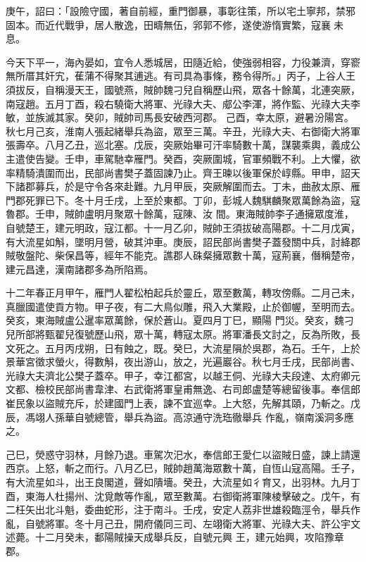 \begin{pinyinscope}
 庚午，詔曰：「設險守國，著自前經，重門御暴，事彰往策，所以宅土寧邦，禁邪固本。而近代戰爭，居人散逸，田疇無伍，郛郭不修，遂使游惰實繁，寇襄未息。



 今天下平一，海內晏如，宜令人悉城居，田隨近給，使強弱相容，力役兼濟，穿窬無所厝其奸宄，萑蒲不得聚其逋逃。有司具為事條，務令得所。」丙子，上谷人王須拔反，自稱漫天王，國號燕，賊帥魏刁兒自稱歷山飛，眾各十餘萬，北連突厥，南寇趙。五月丁酉，殺右驍衛大將軍、光祿大夫、郕公李渾，將作監、光祿大夫李敏，並族滅其家。癸卯，賊帥司馬長安破西河郡。
 己酉，幸太原，避暑汾陽宮。秋七月己亥，淮南人張起緒舉兵為盜，眾至三萬。辛丑，光祿大夫、右御衛大將軍張壽卒。八月乙丑，巡北塞。戊辰，突厥始畢可汗率騎數十萬，謀襲乘輿，義成公主遣使告變。壬申，車駕馳幸雁門。癸酉，突厥圍城，官軍頻戰不利。上大懼，欲率精騎潰圍而出，民部尚書樊子蓋固諫乃止。齊王暕以後軍保於崞縣。甲申，詔天下諸郡募兵，於是守令各來赴難。九月甲辰，突厥解圍而去。丁未，曲赦太原、雁門郡死罪已下。冬十月壬戌，上至於東都。丁卯，彭城人魏騏麟聚眾萬餘為盜，寇魯郡。壬申，賊帥盧明月聚眾十餘萬，寇陳、汝
 間。東海賊帥李子通擁眾度淮，自號楚王，建元明政，寇江都。十一月乙卯，賊帥王須拔破高陽郡。十二月戊寅，有大流星如斛，墜明月營，破其沖車。庚辰，詔民部尚書樊子蓋發關中兵，討絳郡賊敬盤陀、柴保昌等，經年不能克。譙郡人硃粲擁眾數十萬，寇荊襄，僭稱楚帝，建元昌達，漢南諸郡多為所陷焉。



 十二年春正月甲午，雁門人翟松柏起兵於靈丘，眾至數萬，轉攻傍縣。二月己未，真臘國遣使貢方物。甲子夜，有二大鳥似雕，飛入大業殿，止於御幄，至明而去。癸亥，東海賊盧公暹率眾萬餘，保於蒼山。夏四月丁巳，顯陽
 門災。癸亥，魏刁兒所部將甄翟兒復號歷山飛，眾十萬，轉寇太原。將軍潘長文討之，反為所敗，長文死之。五月丙戌朔，日有蝕之，既。癸巳，大流星隕於吳郡，為石。壬午，上於景華宮徵求螢火，得數斛，夜出游山，放之，光遍巖谷。秋七月壬戌，民部尚書、光祿大夫濟北公樊子蓋卒。甲子，幸江都宮，以越王侗、光祿大夫段達、太府卿元文都、檢校民部尚書韋津、右武衛將軍皇甫無逸、右司郎盧楚等總留後事。奉信郎崔民象以盜賊充斥，於建國門上表，諫不宜巡幸。上大怒，先解其頤，乃斬之。戊辰，馮翊人孫華自號總管，舉兵為盜。高涼通守洗珤徹舉兵
 作亂，嶺南溪洞多應之。



 己巳，熒惑守羽林，月餘乃退。車駕次汜水，奉信郎王愛仁以盜賊日盛，諫上請還西京。上怒，斬之而行。八月乙巳，賊帥趙萬海眾數十萬，自恆山寇高陽。壬子，有大流星如斗，出王良閣道，聲如隤墻。癸丑，大流星如彳育又，出羽林。九月丁酉，東海人杜揚州、沈覓敵等作亂，眾至數萬。右御衛將軍陳棱擊破之。戊午，有二枉矢出北斗魁，委曲蛇形，注于南斗。壬戌，安定人荔非世雄殺臨涇令，舉兵作亂，自號將軍。冬十月己丑，開府儀同三司、左翊衛大將軍、光祿大夫、許公宇文述薨。十二月癸未，鄱陽賊操天成舉兵反，自號元興
 王，建元始興，攻陷豫章郡。




\end{pinyinscope}
